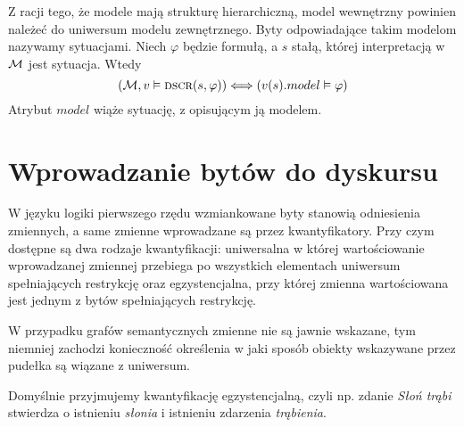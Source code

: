 \documentclass[a4paper,12pt]{article}
\newcommand{\dscr}[2]{\text{{\sc dscr}}(#1,#2)}
\begin{document}
Z racji tego, że modele mają strukturę hierarchiczną, model wewnętrzny powinien należeć do uniwersum modelu zewnętrznego.
Byty odpowiadające takim modelom nazywamy sytuacjami.
Niech $\varphi$ będzie formułą, a $s$ stałą, której interpretacją w ${\cal M}$ jest sytuacja. Wtedy 
\[({\cal M},v\vDash \dscr{s}{\varphi}) \Longleftrightarrow (v(s).model \vDash \varphi)\]
Atrybut $model$ wiąże sytuację, z opisującym ją modelem.


\section{Wprowadzanie bytów do dyskursu}
W języku logiki pierwszego rzędu wzmiankowane byty stanowią odniesienia zmiennych, a
same zmienne wprowadzane są przez kwantyfikatory. Przy czym dostępne są dwa rodzaje kwantyfikacji:
uniwersalna w której wartościowanie wprowadzanej zmiennej przebiega po wszystkich elementach uniwersum
spełniających restrykcję oraz egzystencjalna, przy której zmienna wartościowana jest jednym 
z bytów spełniających restrykcję.

W przypadku grafów semantycznych zmienne nie są jawnie wskazane, tym niemniej 
zachodzi konieczność określenia w jaki sposób obiekty wskazywane przez pudełka 
są wiązane z uniwersum.

Domyślnie przyjmujemy kwantyfikację egzystencjalną, czyli np. zdanie {\it Słoń trąbi}
stwierdza o istnieniu {\it słonia} i istnieniu zdarzenia {\it trąbienia}.
\end{document}
